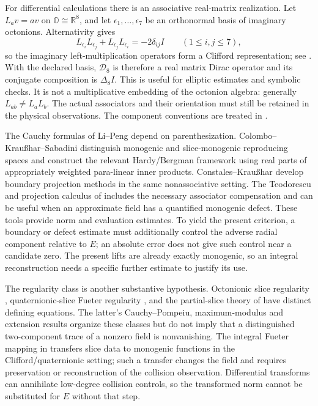 \documentclass[11pt]{article}
\numberwithin{equation}{section}
\theoremstyle{definition}
\theoremstyle{remark}
\newcommand{\R}{\mathbb R}
\newcommand{\OO}{\mathbb O}
\begin{document}
For differential calculations there is an associative real-matrix
realization.  Let $L_a v=av$ on $\OO\cong\R^8$, and let
$\epsilon_1,\ldots,\epsilon_7$ be an orthonormal basis of imaginary
octonions. Alternativity gives
\[
 L_{\epsilon_i}L_{\epsilon_j}+L_{\epsilon_j}L_{\epsilon_i}=-2\delta_{ij}I
 \qquad(1\le i,j\le7),
\]
so the imaginary left-multiplication operators form a Clifford
representation; see \cite[Section~2.3]{baez}.  With the declared basis,
$\mathcal D_8$ is therefore a real matrix Dirac operator and its conjugate
composition is $\Delta_8 I$.  This is useful for elliptic estimates and
symbolic checks.  It is not a multiplicative embedding of the octonion
algebra: generally $L_{ab}\ne L_aL_b$.  The actual associators and their
orientation must still be retained in the physical observations.
The component conventions are treated in \cite{kauhanenorelma}.

The Cauchy formulas of Li--Peng \cite{lipeng} depend on parenthesization.
Colombo--Krau\ss har--Sabadini \cite[Proposition~2.2 and Sections~3--4]{colombokraussharsabadini} distinguish monogenic and slice-monogenic
reproducing spaces and construct the relevant Hardy/Bergman framework
using real parts of appropriately weighted para-linear inner products.
Constales--Krau\ss har \cite{constaleskrausshar} develop boundary projection
methods in the same nonassociative setting.  The Teodorescu and
projection calculus of \cite{teodorescu24} includes the necessary
associator compensation and can be useful when an approximate field has
a quantified monogenic defect.  These tools provide norm and evaluation
estimates.  To yield the present criterion, a boundary or defect estimate
must additionally control the adverse radial component relative to $E$;
an absolute error does not give such control near a candidate zero.
The present lifts are already exactly monogenic, so an integral
reconstruction needs a specific further estimate to justify its use.

The regularity class is another substantive hypothesis.  Octonionic
slice regularity \cite{gentilistruppa}, quaternionic-slice Fueter
regularity \cite{ghiloni}, and the partial-slice theory of
\cite{xusabadini26} have distinct defining equations.  The latter's
Cauchy--Pompeiu, maximum-modulus and extension results organize these
classes but do not imply that a distinguished two-component trace of a
nonzero field is nonvanishing.  The integral Fueter mapping in
\cite{fuetermapping} transfers slice data to monogenic functions in the
Clifford/quaternionic setting; such a transfer changes the field and
requires preservation or reconstruction of the collision observation.
Differential transforms can annihilate low-degree collision controls,
so the transformed norm cannot be substituted for $E$ without that step.
\end{document}
